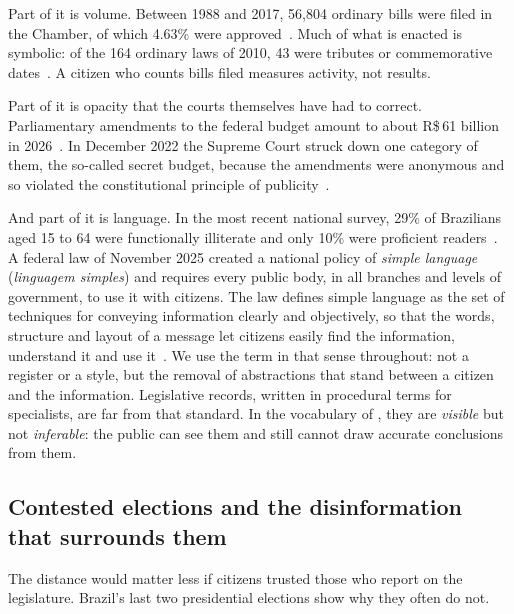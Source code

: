 Part of it is volume. Between 1988 and 2017, 56,804 ordinary bills were filed in the Chamber, of which 4.63\% were approved~\citep{cerdeira2018congresso}. Much of what is enacted is symbolic: of the 164 ordinary laws of 2010, 43 were tributes or commemorative dates~\citep{queiroz2010producao}. A citizen who counts bills filed measures activity, not results.

Part of it is opacity that the courts themselves have had to correct. Parliamentary amendments to the federal budget amount to about R\$\,61 billion in 2026~\citep{senado2026budget}. In December 2022 the Supreme Court struck down one category of them, the so-called secret budget, because the amendments were anonymous and so violated the constitutional principle of publicity~\citep{stf2022secretbudget}.

And part of it is language. In the most recent national survey, 29\% of Brazilians aged 15 to 64 were functionally illiterate and only 10\% were proficient readers~\citep{inaf2024}. A federal law of November 2025 created a national policy of \emph{simple language} (\emph{linguagem simples}) and requires every public body, in all branches and levels of government, to use it with citizens. The law defines simple language as the set of techniques for conveying information clearly and objectively, so that the words, structure and layout of a message let citizens easily find the information, understand it and use it~\citep{brasil2025lei15263}. We use the term in that sense throughout: not a register or a style, but the removal of abstractions that stand between a citizen and the information. Legislative records, written in procedural terms for specialists, are far from that standard. In the vocabulary of \citet{michener2013identifying}, they are \emph{visible} but not \emph{inferable}: the public can see them and still cannot draw accurate conclusions from them.

\subsection{Contested elections and the disinformation that surrounds them}

The distance would matter less if citizens trusted those who report on the legislature. Brazil's last two presidential elections show why they often do not.

